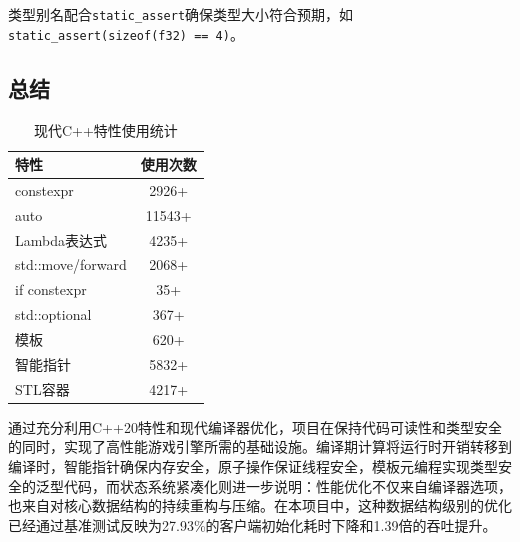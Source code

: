 类型别名配合\texttt{static\_assert}确保类型大小符合预期，如\texttt{static\_assert(sizeof(f32) == 4)}。

\subsection{总结}

\begin{table}[h]
\centering
\caption{现代C++特性使用统计}
\label{tab:cpp_features}
\begin{tabular}{lc}
\toprule
\textbf{特性} & \textbf{使用次数} \\
\midrule
constexpr & 2926+ \\
auto & 11543+ \\
Lambda表达式 & 4235+ \\
std::move/forward & 2068+ \\
if constexpr & 35+ \\
std::optional & 367+ \\
模板 & 620+ \\
智能指针 & 5832+ \\
STL容器 & 4217+ \\
\bottomrule
\end{tabular}
\end{table}

通过充分利用C++20特性和现代编译器优化，项目在保持代码可读性和类型安全的同时，实现了高性能游戏引擎所需的基础设施。编译期计算将运行时开销转移到编译时，智能指针确保内存安全，原子操作保证线程安全，模板元编程实现类型安全的泛型代码，而状态系统紧凑化则进一步说明：性能优化不仅来自编译器选项，也来自对核心数据结构的持续重构与压缩。在本项目中，这种数据结构级别的优化已经通过基准测试反映为27.93\%的客户端初始化耗时下降和1.39倍的吞吐提升。
